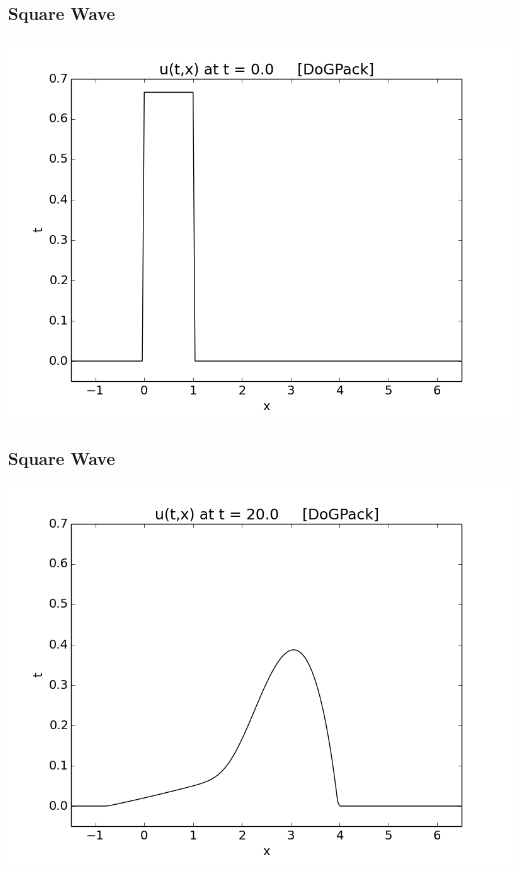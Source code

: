 \documentclass[10pt]{beamer}
\begin{document}

    \begin{frame}
      \frametitle{Square Wave}
      \begin{center}
        \includegraphics[scale=0.5]{Figures/squareWaveInitial.png}
      \end{center}
    \end{frame}
    \begin{frame}
      \frametitle{Square Wave}
      \begin{center}
        \includegraphics[scale=0.5]{Figures/squareWaveFinal.png}
      \end{center}
    \end{frame}
\end{document}
